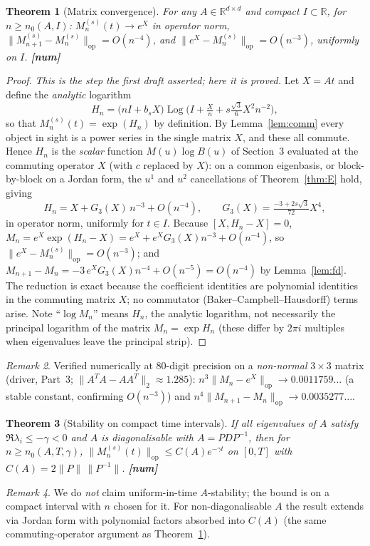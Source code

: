 \documentclass[11pt]{article}
\theoremstyle{plain}
\newtheorem{theorem}{Theorem}
\theoremstyle{definition}
\theoremstyle{remark}
\newtheorem{remark}[theorem]{Remark}
\newcommand{\R}{\mathbb{R}}
\begin{document}
\begin{theorem}[Matrix convergence]\label{thm:matrix}
For any $A\in\R^{d\times d}$ and compact $I\subset\R$, for $n\ge n_0(A,I)$:
$M_n^{(s)}(t)\to e^{X}$ in operator norm,
$\|M_{n+1}^{(s)}-M_n^{(s)}\|_{\mathrm{op}} = O(n^{-4})$, and
$\|e^{X}-M_n^{(s)}\|_{\mathrm{op}} = O(n^{-3})$, uniformly on $I$.
\hfill\textbf{[num]}
\end{theorem}
\begin{proof}
\emph{This is the step the first draft asserted; here it is proved.} Let
$X=At$ and define the \emph{analytic} logarithm
\[
  H_n = \bigl(nI + b_sX\bigr)\operatorname{Log}\bigl(I + \tfrac{X}{n} + s\tfrac{\sqrt3}{6}X^2n^{-2}\bigr),
\]
so that $M_n^{(s)}(t) = \exp(H_n)$ by definition. By Lemma~\ref{lem:comm} every
object in sight is a power series in the single matrix $X$, and these all
commute. Hence $H_n$ is the \emph{scalar} function $M(u)\log B(u)$ of Section~3
evaluated at the commuting operator $X$ (with $c$ replaced by $X$): on a common
eigenbasis, or block-by-block on a Jordan form, the $u^1$ and $u^2$ cancellations
of Theorem~\ref{thm:E} hold, giving
\[
  H_n = X + G_3(X)\,n^{-3} + O(n^{-4}), \qquad
  G_3(X) = \tfrac{-3+2s\sqrt3}{72}X^4,
\]
in operator norm, uniformly for $t\in I$. Because $[X,H_n-X]=0$,
$M_n = e^{X}\exp(H_n - X) = e^{X} + e^{X}G_3(X)n^{-3} + O(n^{-4})$, so
$\|e^{X}-M_n^{(s)}\|_{\mathrm{op}} = O(n^{-3})$; and
$M_{n+1}-M_n = -3\,e^{X}G_3(X)n^{-4} + O(n^{-5}) = O(n^{-4})$ by
Lemma~\ref{lem:fd}. The reduction is exact because the coefficient identities
are polynomial identities in the commuting matrix $X$; no commutator (Baker--Campbell--Hausdorff)
terms arise. Note ``$\log M_n$'' means $H_n$, the analytic logarithm, not
necessarily the principal logarithm of the matrix $M_n=\exp H_n$ (these differ by
$2\pi i$ multiples when eigenvalues leave the principal strip).
\end{proof}

\begin{remark}
Verified numerically at 80-digit precision on a \emph{non-normal} $3\times3$
matrix (driver, Part~3; $\|A^TA-AA^T\|_2\approx1.285$):
$n^3\|M_n-e^{X}\|_{\mathrm{op}} \to 0.0011759\ldots$ (a stable constant,
confirming $O(n^{-3})$) and $n^4\|M_{n+1}-M_n\|_{\mathrm{op}} \to 0.0035277\ldots$.
\end{remark}

\begin{theorem}[Stability on compact time intervals]\label{thm:stab}
If all eigenvalues of $A$ satisfy $\Re\lambda_i\le-\gamma<0$ and $A$ is
diagonalisable with $A=PDP^{-1}$, then for $n\ge n_0(A,T,\gamma)$,
$\|M_n^{(s)}(t)\|_{\mathrm{op}}\le C(A)e^{-\gamma t}$ on $[0,T]$ with
$C(A)=2\|P\|\,\|P^{-1}\|$. \hfill\textbf{[num]}
\end{theorem}
\begin{remark}
We do \emph{not} claim uniform-in-time $A$-stability; the bound is on a compact
interval with $n$ chosen for it. For non-diagonalisable $A$ the result extends via
Jordan form with polynomial factors absorbed into $C(A)$ (the same
commuting-operator argument as Theorem~\ref{thm:matrix}).
\end{remark}
\end{document}
